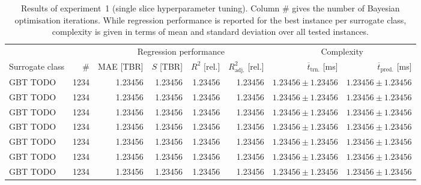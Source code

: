 \begin{table}[h]
	\centering
	{\footnotesize
		\begin{tabular}{lrrrrrrr}
		\toprule
		{} & {} & \multicolumn{4}{c}{Regression performance} &
		\multicolumn{2}{c}{Complexity}\\
		\cmidrule(lr){3-6}
		\cmidrule(lr){7-8}
		Surrogate class & \# & MAE [TBR] & $S$ [TBR] & $R^2$ [rel.] & $R^2_{\text{adj.}}$ [rel.]
						& $\overline{t}_{\text{trn.}}$ [ms] &
						$\overline{t}_{\text{pred.}}$ [ms]\\
		\midrule
		GBT TODO
						& \num{1234}
						& \num{1.23456}
						& \num{1.23456}
						& \num{1.23456}
						& \num{1.23456}
						& $\num{1.23456} \pm \num{1.23456}$
						& $\num{1.23456} \pm \num{1.23456}$
		\\
		GBT TODO
						& \num{1234}
						& \num{1.23456}
						& \num{1.23456}
						& \num{1.23456}
						& \num{1.23456}
						& $\num{1.23456} \pm \num{1.23456}$
						& $\num{1.23456} \pm \num{1.23456}$
		\\
		GBT TODO
						& \num{1234}
						& \num{1.23456}
						& \num{1.23456}
						& \num{1.23456}
						& \num{1.23456}
						& $\num{1.23456} \pm \num{1.23456}$
						& $\num{1.23456} \pm \num{1.23456}$
		\\
		GBT TODO
						& \num{1234}
						& \num{1.23456}
						& \num{1.23456}
						& \num{1.23456}
						& \num{1.23456}
						& $\num{1.23456} \pm \num{1.23456}$
						& $\num{1.23456} \pm \num{1.23456}$
		\\
		GBT TODO
						& \num{1234}
						& \num{1.23456}
						& \num{1.23456}
						& \num{1.23456}
						& \num{1.23456}
						& $\num{1.23456} \pm \num{1.23456}$
						& $\num{1.23456} \pm \num{1.23456}$
		\\
		GBT TODO
						& \num{1234}
						& \num{1.23456}
						& \num{1.23456}
						& \num{1.23456}
						& \num{1.23456}
						& $\num{1.23456} \pm \num{1.23456}$
						& $\num{1.23456} \pm \num{1.23456}$
		\\
		GBT TODO
						& \num{1234}
						& \num{1.23456}
						& \num{1.23456}
						& \num{1.23456}
						& \num{1.23456}
						& $\num{1.23456} \pm \num{1.23456}$
						& $\num{1.23456} \pm \num{1.23456}$
		\\
		\bottomrule
		\end{tabular}
	}
	\caption{Results of experiment~1 (single slice hyperparameter tuning).
		Column \# gives the number of Bayesian optimisation iterations.
		While regression performance is reported for the best instance
		per surrogate class, complexity is given in terms of mean and standard deviation over all tested instances.}
	\label{tbl:exp1-detailed-results}
\end{table}

